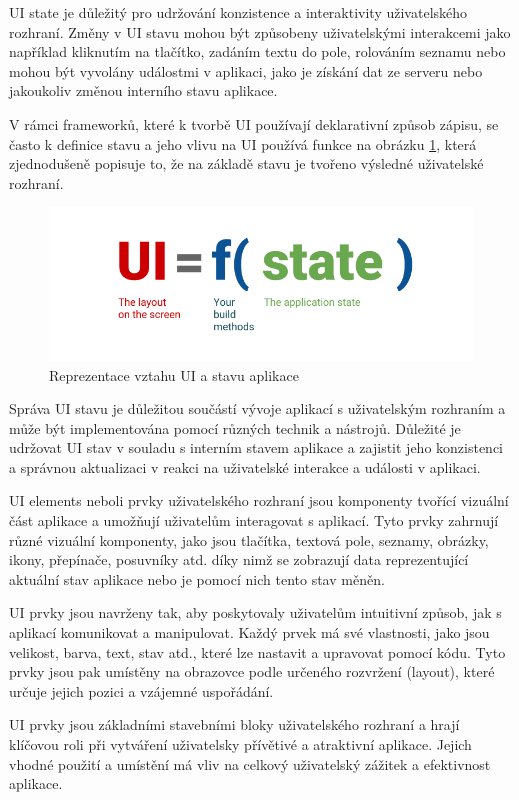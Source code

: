 UI state je důležitý pro udržování konzistence a interaktivity uživatelského rozhraní. Změny v UI stavu mohou být způsobeny uživatelskými
interakcemi jako například kliknutím na tlačítko, zadáním textu do pole, rolováním seznamu nebo mohou být vyvolány událostmi v aplikaci,
jako je získání dat ze serveru nebo jakoukoliv změnou interního stavu aplikace. 

V rámci frameworků, které k tvorbě UI používají deklarativní způsob zápisu, se často k definice stavu a jeho vlivu na UI používá funkce 
na obrázku \ref{fig:UI_function}, která zjednodušeně popisuje to, že na základě stavu je tvořeno výsledné uživatelské rozhraní.

\begin{figure}[H]
  \centering
  \includegraphics[width=.5\textwidth]{ui-equals-function-of-state.png}
  \caption{Reprezentace vztahu UI a stavu aplikace}
  \label{fig:UI_function}
\end{figure}

Správa UI stavu je důležitou součástí vývoje aplikací s uživatelským rozhraním a může být implementována pomocí různých technik a nástrojů.
Důležité je udržovat UI stav v souladu s interním stavem aplikace a zajistit jeho konzistenci a správnou aktualizaci v reakci na uživatelské 
interakce a události v aplikaci.

UI elements neboli prvky uživatelského rozhraní jsou komponenty tvořící vizuální část aplikace a umožňují uživatelům interagovat s aplikací.
Tyto prvky zahrnují různé vizuální komponenty, jako jsou tlačítka, textová pole, seznamy, obrázky, ikony, přepínače, posuvníky atd. díky nimž
se zobrazují data reprezentující aktuální stav aplikace nebo je pomocí nich tento stav měněn.

UI prvky jsou navrženy tak, aby poskytovaly uživatelům intuitivní způsob, jak s aplikací komunikovat a manipulovat. Každý prvek má své 
vlastnosti, jako jsou velikost, barva, text, stav atd., které lze nastavit a upravovat pomocí kódu. Tyto prvky jsou pak umístěny na obrazovce 
podle určeného rozvržení (layout), které určuje jejich pozici a vzájemné uspořádání.

UI prvky jsou základními stavebními bloky uživatelského rozhraní a hrají klíčovou roli při vytváření uživatelsky přívětivé a atraktivní aplikace. 
Jejich vhodné použití a umístění má vliv na celkový uživatelský zážitek a efektivnost aplikace.

